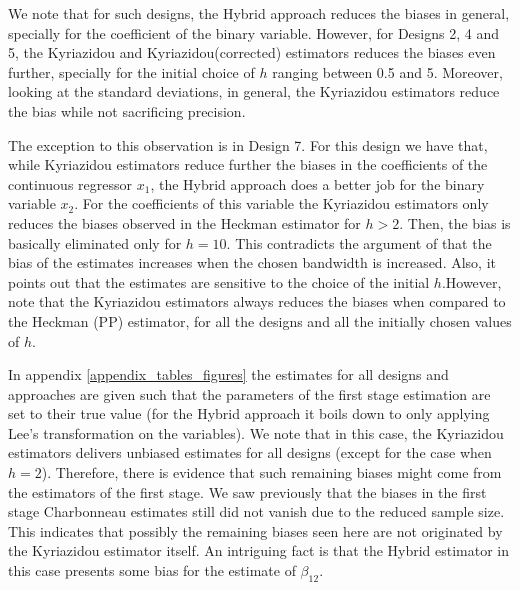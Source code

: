 We note that for such designs, the Hybrid approach reduces the biases in general, specially for the coefficient of the binary variable. However, for Designs 2, 4 and 5, the Kyriazidou and Kyriazidou(corrected) estimators reduces the biases even further, specially for the initial choice of $h$ ranging between 0.5 and 5. Moreover, looking at the standard deviations, in general, the Kyriazidou estimators reduce the bias while not sacrificing precision.

The exception to this observation is in Design 7. For this design we have that, while Kyriazidou estimators reduce further the biases in the coefficients of the continuous regressor $x_1$, the Hybrid approach does a better job for the binary variable $x_2$. For the coefficients of this variable the Kyriazidou estimators only reduces the biases observed in the Heckman estimator for $h>2$. Then, the bias is basically eliminated only for $h=10$. This contradicts the argument of \cite{kyriazidou1997estimation} that the bias of the estimates increases when the chosen bandwidth is increased. Also, it points out that the estimates are sensitive to the choice of the initial $h$.However, note that the Kyriazidou estimators always reduces the biases when compared to the Heckman (PP) estimator, for all the designs and all the initially chosen values of $h$.

In appendix \ref{appendix_tables_figures} the estimates for all designs and approaches are given such that the parameters of the first stage estimation are set to their true value (for the Hybrid approach it boils down to only applying Lee's transformation on the variables). We note that in this case, the Kyriazidou estimators delivers unbiased estimates for all designs (except for the case when $h=2$). Therefore, there is evidence that such remaining biases might come from the estimators of the first stage. We saw previously that the biases in the first stage Charbonneau estimates still did not vanish due to the reduced sample size. This indicates that possibly the remaining biases seen here are not originated by the Kyriazidou estimator itself. An intriguing fact is that the Hybrid estimator in this case presents some bias for the estimate of $\beta_{12}$.

